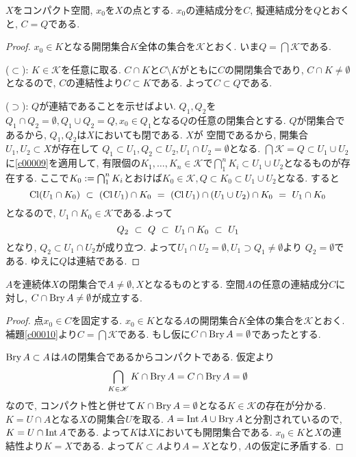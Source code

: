 \documentclass[uplatex, dvipdfmx, a4paper, 12pt, class=jsbook, crop=false]{standalone}
\begin{document}
\begin{lemma}
	\label{c00010}
	$ X $をコンパクト\Hausdorff 空間, $ x_0 $を$ X $の点とする.
	$ x_0 $の連結成分を$ C $, 擬連結成分を$ Q $とおくと, $ C = Q $である.
\end{lemma}

\begin{proof}
	$ x_0 \in K $となる開閉集合$ K $全体の集合を$ \mathscr{K} $とおく. いま$ Q  = \bigcap \mathscr{K}$である.

	($ \subset $): $ K \in \mathscr{K} $を任意に取る.
	$ C \cap K $と$ C \setminus K $がともに$ C $の開閉集合であり,
	$ C \cap K \neq \emptyset $となるので, $ C $の連結性より$ C \subset K $である.
	よって$ C \subset Q $である.

	($ \supset $): $ Q $が連結であることを示せばよい.
	$ Q_1, Q_2 $を$ Q_1 \cap Q_2 = \emptyset, Q_1 \cup Q_2 = Q , x_0 \in Q_1$となる$ Q $の任意の閉集合とする.
	$ Q $が閉集合であるから, $ Q_1, Q_2 $は$ X $においても閉である.
	$ X $が  空間であるから, 開集合$ U_1, U_2 \subset X $が存在して
	$ Q_1 \subset U_1, Q_2 \subset U_2, U_1 \cap U_2 = \emptyset $となる.
	$ \bigcap \mathscr{K} = Q \subset U_1 \cup U_2 $に\cref{c00009}を適用して,
	有限個の$ K_1 , \ldots, K_n \in \mathscr{K}$で$ \bigcap_{1}^{n} K_i \subset U_1 \cup U_2$となるものが存在する.
	ここで$ K_0 \mathrel{:=} \bigcap_{1}^{n} K_i $とおけば$ K_0 \in \mathscr{K}, Q \subset K_0 \subset U_1 \cup U_2 $となる.
	すると
	\[ \topcl \lrparen{U_1 \cap K_0} \longrel{\subset} \lrparen{\topcl U_1} \cap K_0
	\longrel{=} \left(\topcl U_1 \right) \cap (U_1 \cup U_2) \cap K_0 \longrel{=} U_1 \cap K_0\]
	となるので, $ U_1 \cap K_0 \in \mathscr{K} $である.よって
	\[ Q_2 \ \subset\  Q \ \subset\  U_1 \cap K_0 \ \subset\  U_1 \]
	となり, $ Q_2 \subset U_1 \cap U_2 $が成り立つ.
	よって$ U_1 \cap U_2 = \emptyset, U_1 \supset Q_1 \neq \emptyset $より
	$ Q_2 = \emptyset $である. ゆえに$ Q $は連結である.
\end{proof}

\begin{lemma}
	\label{c00011}
	$ A $を連続体$ X $の閉集合で$ A \neq \emptyset, X $となるものとする.
	空間$ A $の任意の連結成分$ C $に対し, $ C \cap \mathop{\mathrm{Bry}}\nolimits A \neq \emptyset $が成立する.
\end{lemma}

\begin{proof}
	点$ x_0 \in C $を固定する. $ x_0 \in K $となる$ A $の開閉集合$ K $全体の集合を$ \mathscr{K} $とおく.
	補題\cref{c00010}より$ C = \bigcap \mathscr{K} $である. もし仮に$ C \cap \mathop{\mathrm{Bry}}\nolimits A = \emptyset $であったとする.

	$ \mathop{\mathrm{Bry}}\nolimits A \subset A $は$ A $の閉集合であるからコンパクトである. 仮定より
	\[ \bigcap_{K \in \mathscr{K}} K \cap \mathop{\mathrm{Bry}}\nolimits A = C \cap \mathop{\mathrm{Bry}}\nolimits A = \emptyset \]
	なので, コンパクト性と併せて$ K \cap \mathop{\mathrm{Bry}}\nolimits A = \emptyset $となる$ K \in \mathscr{K} $の存在が分かる.
	$ K = U \cap A  $となる$ X $の開集合$ U $を取る. $ A = \mathop{\mathrm{Int}}\nolimits A \cup \mathop{\mathrm{Bry}}\nolimits A $と分割されているので,
	$ K = U \cap \mathop{\mathrm{Int}}\nolimits A $である. よって$ K $は$ X $においても開閉集合である.
	$ x_0 \in K $と$ X $の連結性より$ K = X $である.
	よって$ K \subset A $より$ A = X $となり, $ A $の仮定に矛盾する.
\end{proof}
\end{document}
